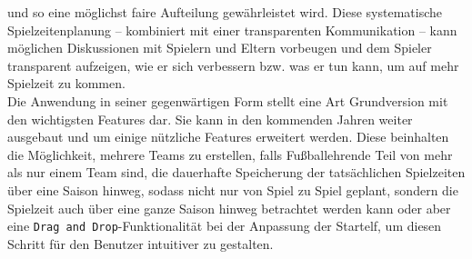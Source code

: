 und so eine möglichst faire Aufteilung gewährleistet wird. Diese systematische 
Spielzeitenplanung -- kombiniert mit einer transparenten Kommunikation -- kann 
möglichen Diskussionen mit Spielern und Eltern vorbeugen und dem Spieler transparent 
aufzeigen, wie er sich verbessern bzw. was er tun kann, um auf mehr Spielzeit zu 
kommen. \\ 
Die Anwendung in seiner gegenwärtigen Form stellt eine Art Grundversion mit den 
wichtigsten Features dar. Sie kann in den kommenden Jahren weiter ausgebaut und um 
einige nützliche Features erweitert werden. Diese beinhalten die Möglichkeit, mehrere 
Teams zu erstellen, falls Fußballehrende Teil von mehr als nur einem Team sind, die 
dauerhafte Speicherung der tatsächlichen Spielzeiten über eine Saison hinweg, sodass 
nicht nur von Spiel zu Spiel geplant, sondern die Spielzeit auch über eine ganze Saison 
hinweg betrachtet werden kann oder aber eine \texttt{Drag and Drop}-Funktionalität 
bei der Anpassung der Startelf, um diesen Schritt für den Benutzer intuitiver zu 
gestalten. 

